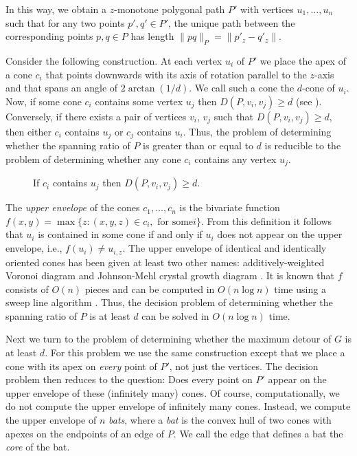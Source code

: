 \documentclass[lotsofwhite]{patmorin}
\begin{document}
In this way, we obtain a $z$-monotone polygonal path $P'$ with
vertices $u_1,\ldots,u_n$ such that for any two points $p',q'\in P'$,
the unique path between the corresponding points $p,q\in P$ has length
$\|pq\|_P=\|p'_z-q'_z\|$.

Consider the following construction.  At each vertex $u_i$ of $P'$ we
place the apex of a cone $c_i$ that points downwards with its axis of
rotation parallel to the $z$-axis and that spans an angle of
$2\arctan(1/d)$.  We call such a cone the $d$-cone of $u_i$.  Now, if
some cone $c_i$ contains some vertex $u_j$ then $D(P,v_i,v_j)\ge d$
(see ).  Conversely, if there exists a pair of vertices
$v_i$, $v_j$ such that $D(P,v_i,v_j)\ge d$, then either $c_i$ contains
$u_j$ or $c_j$ contains $u_{i}$.  Thus, the problem of determining
whether the spanning ratio of $P$ is greater than or equal to $d$ is
reducible to the problem of determining whether any cone $c_i$
contains any vertex $u_j$.

\begin{figure}
\caption{If $c_i$ contains $u_j$ then $D(P,v_i,v_j)\ge d$.}
\end{figure}

The \emph{upper envelope} of the cones $c_1,\ldots,c_n$ is the
bivariate function $f(x,y)=\max\{z:(x,y,z)\in c_i,\mbox{ for some
$i$}\}$.  From this definition it follows that $u_i$ is contained in
some cone if and only if $u_i$ does not appear on the upper envelope,
i.e., $f(u_i)\neq u_{i,z}$.  The upper envelope of identical and
identically oriented cones has been given at least two other names:
additively-weighted Voronoi diagram \cite{f87} and Johnson-Mehl
crystal growth diagram \cite{jm39}.  It is known that $f$ consists of
$O(n)$ pieces and can be computed in $O(n\log n)$ time using a sweep
line algorithm \cite{f87}.  Thus, the decision problem of determining
whether the spanning ratio of $P$ is at least $d$ can be solved in
$O(n\log n)$ time.

Next we turn to the problem of determining whether the maximum detour
of $G$ is at least $d$.  For this problem we use the same construction
except that we place a cone with its apex on \emph{every} point of
$P'$, not just the vertices.  The decision problem then reduces to the
question: Does every point on $P'$ appear on the upper envelope of
these (infinitely many) cones.  Of course, computationally, we do not
compute the upper envelope of infinitely many cones.  Instead, we
compute the upper envelope of $n$ \emph{bats}, where a \emph{bat} is
the convex hull of two cones with apexes on the endpoints of an edge
of $P$.  We call the edge that defines a bat the \emph{core} of the
bat.
\end{document}
